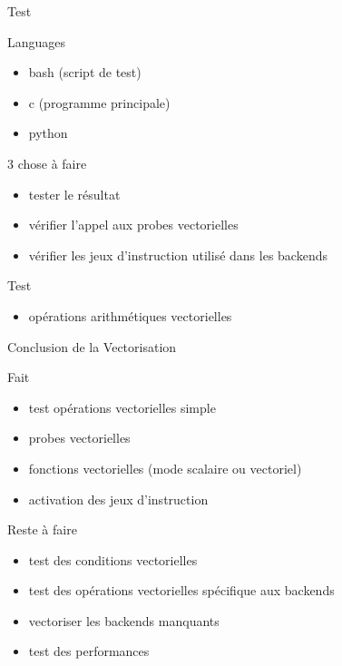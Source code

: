 \documentclass{beamer}
\begin{document}
\begin{frame}{Test}

  \begin{block}{Languages}
    \begin{itemize}
    \item bash (script de test)
    \item c (programme principale)
    \item python
    \end{itemize}
  \end{block}

  \begin{block}{3 chose à faire}
    \begin{itemize}
    \item tester le résultat
    \item vérifier l'appel aux probes vectorielles
    \item vérifier les jeux d'instruction utilisé dans les backends
    \end{itemize}
  \end{block}

  \begin{block}{Test}
    \begin{itemize}
    \item opérations arithmétiques vectorielles
    \end{itemize}
  \end{block}

\end{frame}

\begin{frame}{Conclusion de la Vectorisation}

  \begin{block}{Fait}
    \begin{itemize}
    \item test opérations vectorielles simple
    \item probes vectorielles
    \item fonctions vectorielles (mode scalaire ou vectoriel)
    \item activation des jeux d'instruction
    \end{itemize}
  \end{block}

  \begin{alertblock}{Reste à faire}
    \begin{itemize}
    \item test des conditions vectorielles
    \item test des opérations vectorielles spécifique aux backends
    \item vectoriser les backends manquants
    \item test des performances
    \end{itemize}
  \end{alertblock}

\end{frame}
\end{document}
